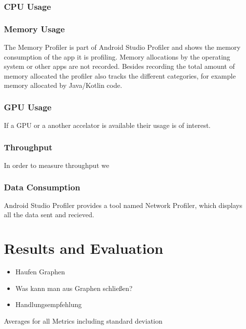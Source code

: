 \subsubsection{CPU Usage}

\subsubsection{Memory Usage}
The Memory Profiler is part of Android Studio Profiler and shows the memory consumption of the app it is profiling. Memory allocations by the operating system or other apps are not recorded. Besides recording the total amount of memory allocated the profiler also tracks the different categories, for example memory allocated by Java/Kotlin code.
\subsubsection{GPU Usage}
If a GPU or a another accelator is available their usage is of interest.
\subsubsection{Throughput}
In order to measure throughput we 
\subsubsection{Data Consumption}
Android Studio Profiler provides a tool named Network Profiler, which displays all the data sent and recieved.
\section{Results and Evaluation}
\begin{itemize}
    \item Haufen Graphen
    \item Was kann man aus Graphen schließen?
    \item Handlungsempfehlung
\end{itemize}
\begin{table}


    \centering
\scalebox{0.5}{
}
\caption{Averages for all Metrics including standard deviation}

\end{table}
\endinput 
